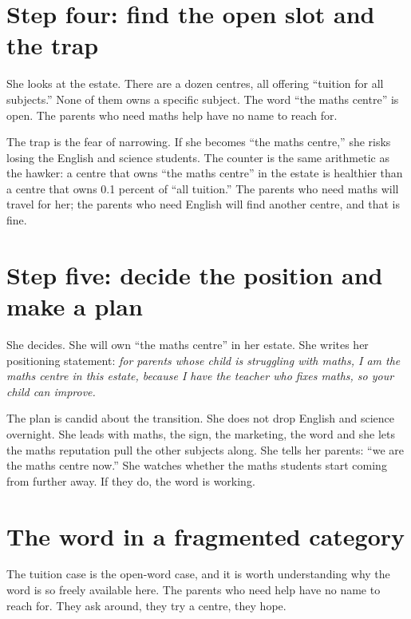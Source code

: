 \documentclass[10pt,twoside,openany]{memoir}
\newcommand{\needspacehead}{\needspace{4\baselineskip}}
\let\oldsection\section
\renewcommand{\section}{\needspacehead\oldsection}
\begin{document}
{\section{Step four: find the open slot and the
trap}\label{step-four-find-the-open-slot-and-the-trap-1}

She looks at the estate. There are a dozen centres, all offering
``tuition for all subjects.'' None of them owns a specific subject. The
word ``the maths centre'' is open. The parents who need maths help have
no name to reach for.

The trap is the fear of narrowing. If she becomes ``the maths centre,''
she risks losing the English and science students. The counter is the
same arithmetic as the hawker: a centre that owns ``the maths centre''
in the estate is healthier than a centre that owns 0.1 percent of ``all
tuition.'' The parents who need maths will travel for her; the parents
who need English will find another centre, and that is fine.

\section{Step five: decide the position and make a
plan}\label{step-five-decide-the-position-and-make-a-plan-2}

She decides. She will own ``the maths centre'' in her estate. She writes
her positioning statement: \emph{for parents whose child is struggling
with maths, I am the maths centre in this estate, because I have the
teacher who fixes maths, so your child can improve.}

The plan is candid about the transition. She does not drop English and
science overnight. She leads with maths, the sign, the marketing, the
word and she lets the maths reputation pull the other subjects along.
She tells her parents: ``we are the maths centre now.'' She watches
whether the maths students start coming from further away. If they do,
the word is working.

\section{The word in a fragmented
category}\label{the-word-in-a-fragmented-category}

The tuition case is the open-word case, and it is worth understanding
why the word is so freely available here. The parents who need help have
no name to reach for. They ask around, they try a centre, they hope.

}
\end{document}
